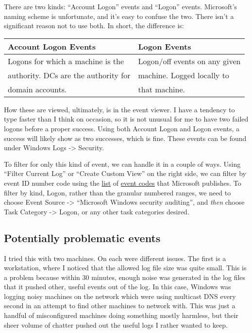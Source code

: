 There are two kinds: ``Account Logon'' events and ``Logon'' events.
Microsoft's naming scheme is unfortunate, and it's easy to confuse the
two. There isn't a significant reason not to use both. In short, the
difference is:

\begin{longtable}[]{@{}ll@{}}
\toprule
Account Logon Events & Logon Events\tabularnewline
\midrule
\endhead
Logons for which a machine is the & Logon/off events on any
given\tabularnewline
authority. DCs are the authority for & machine. Logged locally
to\tabularnewline
domain accounts. & that machine.\tabularnewline
\bottomrule
\end{longtable}

How these are viewed, ultimately, is in the event viewer. I have a
tendency to type faster than I think on occasion, so it is not unusual
for me to have two failed logons before a proper success. Using both
Account Logon and Logon events, a success will likely show as two
successes, which is fine. These events can be found under Windows Logs
-\textgreater{} Security.

To filter for only this kind of event, we can handle it in a couple of
ways. Using ``Filter Current Log'' or ``Create Custom View'' on the
right side, we can filter by event ID number code using the
\href{https://docs.microsoft.com/en-us/windows/security/threat-protection/auditing/basic-audit-logon-events}{list}
of
\href{https://docs.microsoft.com/en-us/windows/security/threat-protection/auditing/basic-audit-account-logon-events}{event
codes} that Microsoft publishes. To filter by kind, Logon, rather than
the granular numbered ranges, we need to choose Event Source
-\textgreater{} ``Microsoft Windows security auditing'', and \emph{then}
choose Task Category -\textgreater{} Logon, or any other task categories
desired.

\hypertarget{potentially-problematic-events}{%
\subsection{Potentially problematic
events}\label{potentially-problematic-events}}

I tried this with two machines. On each were different issues. The first
is a workstation, where I noticed that the allowed log file size was
quite small. This is a problem because within 30 minutes, enough noise
was generated in the log files that it pushed other, useful events out
of the log. In this case, Windows was logging noisy machines on the
network which were using multicast DNS every second in an attempt to
find other machines to network with. This was just a handful of
misconfigured machines doing something mostly harmless, but their sheer
volume of chatter pushed out the useful logs I rather wanted to keep.

